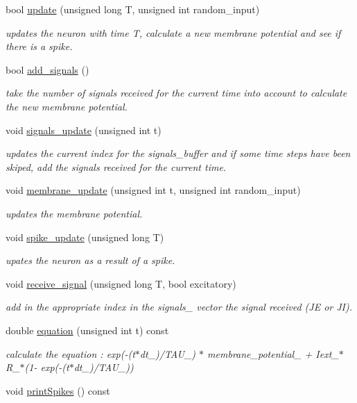 \begin{DoxyCompactItemize}
bool \hyperlink{classNeuron_a2dce22bfbe82aa6df37f4f677437369b}{update} (unsigned long T, unsigned int random\-\_\-input)
\begin{DoxyCompactList}\small\item\em updates the neuron with time T, calculate a new membrane potential and see if there is a spike. \end{DoxyCompactList}\item 
bool \hyperlink{classNeuron_aa5ea653cd2d2c9d5e26aa7d62aa67c66}{add\-\_\-signals} ()
\begin{DoxyCompactList}\small\item\em take the number of signals received for the current time into account to calculate the new membrane potential. \end{DoxyCompactList}\item 
void \hyperlink{classNeuron_a56bb8165e1f411c299bda4d83fe313be}{signals\-\_\-update} (unsigned int t)
\begin{DoxyCompactList}\small\item\em updates the current index for the signals\-\_\-buffer and if some time steps have been skiped, add the signals received for the current time. \end{DoxyCompactList}\item 
void \hyperlink{classNeuron_accee8011d930156bfeeb22ff0c8ee15d}{membrane\-\_\-update} (unsigned int t, unsigned int random\-\_\-input)
\begin{DoxyCompactList}\small\item\em updates the membrane potential. \end{DoxyCompactList}\item 
void \hyperlink{classNeuron_aafae1db291da75e71e64ab30e86ec386}{spike\-\_\-update} (unsigned long T)
\begin{DoxyCompactList}\small\item\em upates the neuron as a result of a spike. \end{DoxyCompactList}\item 
void \hyperlink{classNeuron_ae7525724f99def7bc878322fc8b76609}{receive\-\_\-signal} (unsigned long T, bool excitatory)
\begin{DoxyCompactList}\small\item\em add in the appropriate index in the signals\-\_\- vector the signal received (J\-E or J\-I). \end{DoxyCompactList}\item 
double \hyperlink{classNeuron_a387cdee004b66b26b104fe8ebe70c547}{equation} (unsigned int t) const 
\begin{DoxyCompactList}\small\item\em calculate the equation \-: exp(-\/(t$\ast$dt\-\_\-)/\-T\-A\-U\-\_\-) $\ast$ membrane\-\_\-potential\-\_\- + Iext\-\_\-$\ast$\-R\-\_\-$\ast$(1-\/ exp(-\/(t$\ast$dt\-\_\-)/\-T\-A\-U\-\_\-)) \end{DoxyCompactList}\item 
\hypertarget{classNeuron_a3325375c3e88979eea14609f00c5df98}{void \hyperlink{classNeuron_a3325375c3e88979eea14609f00c5df98}{print\-Spikes} () const }\label{classNeuron_a3325375c3e88979eea14609f00c5df98}


\end{DoxyCompactItemize}
